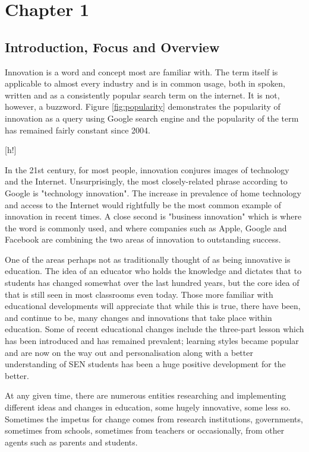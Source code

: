 \section{Chapter 1}
\subsection{Introduction, Focus and Overview}
Innovation is a word and concept most are familiar with. The term itself is applicable to almost every industry and is in common usage, both in spoken, written and as a consistently popular search term on the internet. \cite{CorpusofContemporaryAmericanEnglish,Google} It is not, however, a buzzword. Figure \ref{fig:popularity} demonstrates the popularity of innovation as a query using Google search engine and the popularity of the term has remained fairly constant since 2004.

[h!]

In the 21st century, for most people, innovation conjures images of technology and the Internet. Unsurprisingly, the most closely-related phrase according to Google is "technology innovation". \cite{Google} The increase in prevalence of home technology and access to the Internet would rightfully be the most common example of innovation in recent times. A close second is "business innovation" which is where the word is commonly used, and where companies such as Apple, Google and Facebook are combining the two areas of innovation to outstanding success.

One of the areas perhaps not as traditionally thought of as being innovative is education. The idea of an educator who holds the knowledge and dictates that to students has changed somewhat over the last hundred years, but the core idea of that is still seen in most classrooms even today. Those more familiar with educational developments will appreciate that while this is true, there have been, and continue to be, many changes and innovations that take place within education. Some of recent educational changes include the three-part lesson which has been introduced and has remained prevalent; learning styles became popular and are now on the way out \cite{coffield2004should} and personalisation along with a better understanding of SEN students has been a huge positive development for the better.

At any given time, there are numerous entities researching and implementing different ideas and changes in education, some hugely innovative, some less so. Sometimes the impetus for change comes from research institutions, governments, sometimes from schools, sometimes from teachers or occasionally, from other agents such as parents and students. 

